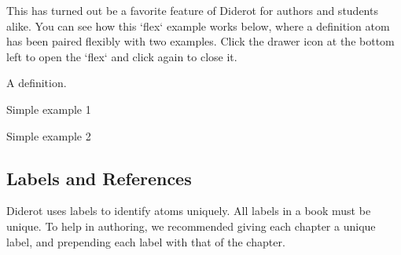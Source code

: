 \begin{note}
This has turned out be a favorite feature of Diderot for authors and students alike. 
%
You can see how this `flex` example works below, where a definition atom
has been paired flexibly with two examples.  Click the drawer icon
at the bottom left to open the `flex` and click again to close it.
\end{note}

\begin{flex}
\begin{definition}[A Definition]
\label{def:a}
A definition.
\end{definition}

\begin{example}
\label{ex:simple-1}
Simple example 1
\end{example}

\begin{example}
\label{ex:simple-2}
Simple example 2
\end{example}

\end{flex}
  

\subsection{Labels and References}

Diderot uses labels to identify atoms uniquely. All labels
in a book must be unique.  To help in authoring, we recommended giving
each chapter a unique label, and prepending each label with that of
the chapter.


